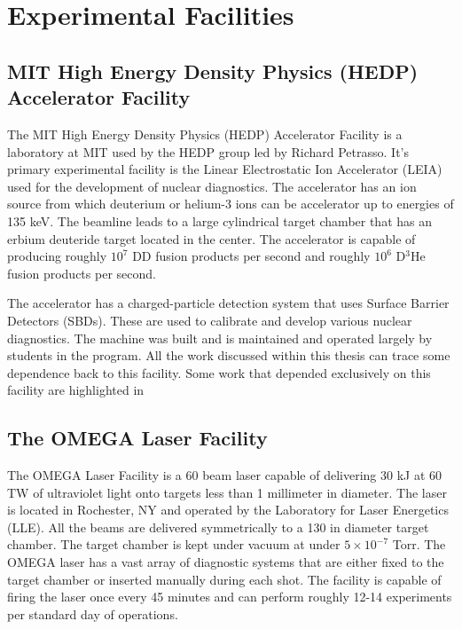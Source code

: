 \section{Experimental Facilities}


\subsection{MIT High Energy Density Physics (HEDP) Accelerator Facility}

	The MIT High Energy Density Physics (HEDP) Accelerator Facility is a laboratory at MIT used by the HEDP group led by Richard Petrasso. It's primary experimental facility is the Linear Electrostatic Ion Accelerator (LEIA) used for the development of nuclear diagnostics. The accelerator has an ion source from which deuterium or helium-3 ions can be accelerator up to energies of 135 keV. The beamline leads to a large cylindrical target chamber that has an erbium deuteride target located in the center. The accelerator is capable of producing roughly $10^7$ DD fusion products per second and roughly $10^6$ D$^3$He fusion products per second.
	
	\begin{figure}[h!]
		\centering
		\caption{}
	\end{figure}
	
	The accelerator has a charged-particle detection system that uses Surface Barrier Detectors (SBDs). These are used to calibrate and develop various nuclear diagnostics. The machine was built and is maintained and operated largely by students in the program. All the work discussed within this thesis can trace some dependence back to this facility. Some work that depended exclusively on this facility are highlighted in 

\subsection{The OMEGA Laser Facility}
\label{sec:OMEGA}

	The OMEGA Laser Facility is a 60 beam laser capable of delivering 30 kJ at 60 TW of ultraviolet light onto targets less than 1 millimeter in diameter. The laser is located in Rochester, NY and operated by the Laboratory for Laser Energetics (LLE). All the beams are delivered symmetrically to a 130 in diameter target chamber. The target chamber is kept under vacuum at under $5\times10^{-7}$ Torr. The OMEGA laser has a vast array of diagnostic systems that are either fixed to the target chamber or inserted manually during each shot. The facility is capable of firing the laser once every 45 minutes and can perform roughly 12-14 experiments per standard day of operations. 
	
